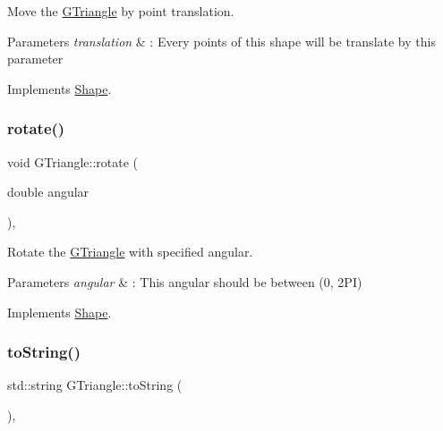 Move the \hyperlink{classGTriangle}{G\+Triangle} by point translation. 


\begin{DoxyParams}{Parameters}
{\em translation} & \+: Every points of this shape will be translate by this parameter \\
\hline
\end{DoxyParams}


Implements \hyperlink{classShape_a52649731b2cb7b67315882d5e005f7e8}{Shape}.

\mbox{\label{classGTriangle_ae3ed75bbad4ba7fed68bc06c5834cfbe}} 
\subsubsection{\texorpdfstring{rotate()}{rotate()}}
{\footnotesize\ttfamily void G\+Triangle\+::rotate (\begin{DoxyParamCaption}\item[{double}]{angular }\end{DoxyParamCaption})\hspace{0.3cm}{\ttfamily [override]}, {\ttfamily [virtual]}}



Rotate the \hyperlink{classGTriangle}{G\+Triangle} with specified angular. 


\begin{DoxyParams}{Parameters}
{\em angular} & \+: This angular should be between (0, 2\+PI) \\
\hline
\end{DoxyParams}


Implements \hyperlink{classShape_a2dea8616fd40f2d69fd208715921982a}{Shape}.

\mbox{\label{classGTriangle_a8381aeea39fac0d52ad9e0d45b791b3b}} 
\subsubsection{\texorpdfstring{to\+String()}{toString()}}
{\footnotesize\ttfamily std\+::string G\+Triangle\+::to\+String (\begin{DoxyParamCaption}{ }\end{DoxyParamCaption})\hspace{0.3cm}{\ttfamily [override]}, {\ttfamily [virtual]}}



